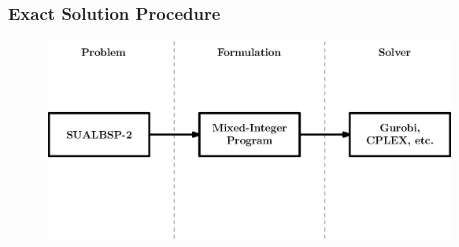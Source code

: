 \documentclass{beamer}
\begin{document}
\begin{frame}
\frametitle{Exact Solution Procedure}
\begin{figure}
	\centering
	\includegraphics[width=0.95\textwidth]{images/mipApproach.eps}
\end{figure}
\end{frame}
\end{document}
